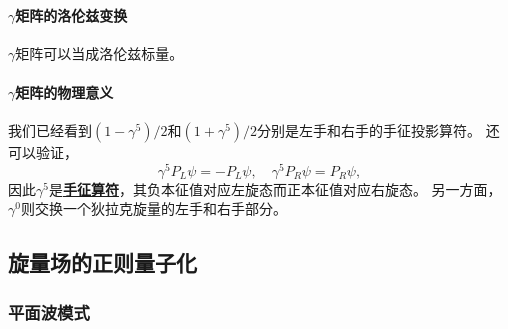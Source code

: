 \documentclass[hyperref, UTF8, a4paper]{ctexart}
\newcommand{\concept}[1]{\underline{\textbf{#1}}}
\begin{document}
\paragraph{$\gamma$矩阵的洛伦兹变换} %

$\gamma$矩阵可以当成洛伦兹标量。 %

\paragraph{$\gamma$矩阵的物理意义} 我们已经看到$(1-\gamma^5)/2$和$(1+\gamma^5)/2$分别是左手和右手的手征投影算符。
还可以验证，
\begin{equation}
    \gamma^5 P_L \psi = - P_L \psi, \quad \gamma^5 P_R \psi = P_R \psi,
\end{equation}
因此$\gamma^5$是\concept{手征算符}，其负本征值对应左旋态而正本征值对应右旋态。
另一方面，$\gamma^0$则交换一个狄拉克旋量的左手和右手部分。

\subsection{旋量场的正则量子化}

\subsubsection{平面波模式}
\end{document}
